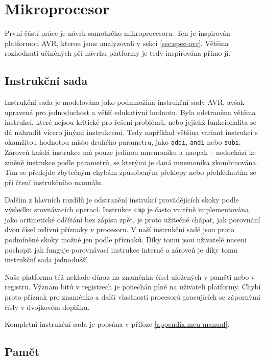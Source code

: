 \chapter{Mikroprocesor}

První částí práce je návrh samotného mikroprocesoru. Ten je inspirován platformou AVR, kterou jsme analyzovali v sekci \ref{sec:spec-avr}. Většina rozhodnutí učiněných při návrhu platformy je tedy inspirována přímo jí.

\section{Instrukční sada}

Instrukční sada je modelována jako podmnožina instrukční sady AVR, avšak upravená pro jednoduchost a větší edukativní hodnotu. Byla odstraněna většina instrukcí, které nejsou kritické pro řešení problémů, nebo jejichž funkcionalita se dá nahradit vícero jinými instrukcemi. Tedy například většina variant instrukcí s okamžitou hodnotou místo druhého parametru, jako \texttt{addi}, \texttt{andi} nebo \texttt{subi}. Zároveň každá instrukce má pouze jedinou mnemoniku a naopak -- nedochází ke změně instrukce podle parametrů, se kterými je daná mnemonika zkombinována. Tím se předejde zbytečným chybám způsobeným překlepy nebo přehlédnutím se při čtení instrukčního manuálu.

Dalším z hlavních rozdílů je odstranění instrukcí provádějících skoky podle výsledku srovnávacích operací. Instrukce \texttt{cmp} je často vnitřně implementována jako aritmetické odčítání bez zápisu zpět, je proto užitečné chápat, jak porovnání dvou čísel ovlivní příznaky v procesoru. V naší instrukční sadě jsou proto podmíněné skoky možné jen podle příznaků. Díky tomu jsou uživatelé nuceni pochopit jak funguje porovnávací instrukce interně a zároveň je díky tomu instrukční sada jednodušší.

Naše platforma též neklade důraz na znaménka čísel uložených v paměti nebo v registru. Význam bitů v registrech je ponechán plně na uživateli platformy. Chybí proto příznak pro znaménko a další vlastnosti procesorů pracujících se zápornými čísly v dvojkovém doplňku.

Kompletní instrukční sada je popsána v příloze \ref{appendix:mcu-manual}.

\section{Pamět}

